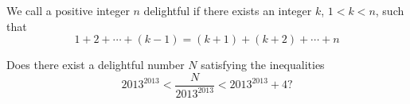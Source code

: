 We call a positive integer $n$ delightful if there exists an integer $k$,  $1 < k < n$,  such that\[1+2+\cdots+(k-1)=(k+1)+(k+2)+\cdots+n\]

Does there exist a delightful number $N$ satisfying the inequalities\[2013^{2013}<\dfrac{N}{2013^{2013}}<2013^{2013}+4 ?\]